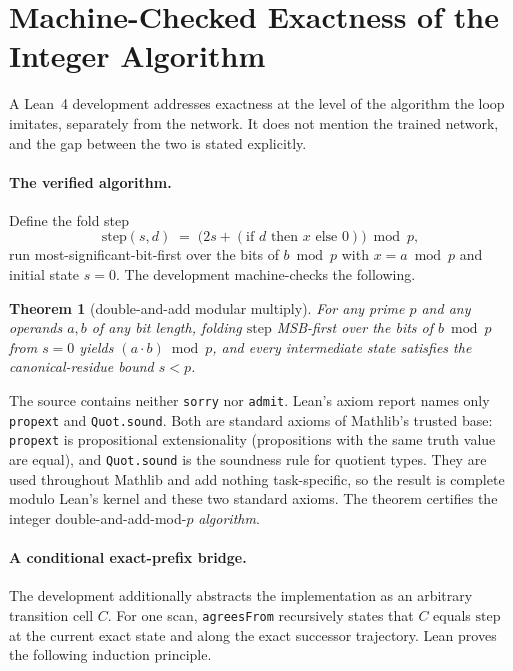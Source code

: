 \documentclass[11pt]{article}
\newtheorem{theorem}{Theorem}
\begin{document}
\section{Machine-Checked Exactness of the Integer Algorithm}
\label{sec:lean}

A Lean~4 development addresses exactness at the level of the algorithm the loop
imitates, separately from the network. It does not mention the trained network, and
the gap between the two is stated explicitly.

\paragraph{The verified algorithm.}
Define the fold step
\[
 \mathrm{step}(s,d) \;=\; \bigl(2s + (\text{if } d \text{ then } x \text{ else } 0)\bigr) \bmod p ,
\]
run most-significant-bit-first over the bits of $b \bmod p$ with $x = a \bmod p$ and
initial state $s = 0$. The development machine-checks the following.

\begin{theorem}[double-and-add modular multiply]
For any prime $p$ and any operands $a, b$ of any bit length, folding
$\mathrm{step}$ MSB-first over the bits of $b \bmod p$ from $s = 0$ yields
$(a \cdot b) \bmod p$, and every intermediate state satisfies the canonical-residue
bound $s < p$.
\end{theorem}

The source contains neither \texttt{sorry} nor \texttt{admit}. Lean's axiom
report names only \texttt{propext} and \texttt{Quot.sound}. Both are standard axioms of Mathlib's
trusted base: \texttt{propext} is propositional extensionality (propositions with
the same truth value are equal), and \texttt{Quot.sound} is the soundness rule for
quotient types. They are used throughout Mathlib and add nothing task-specific, so
the result is complete modulo Lean's kernel and these two standard axioms. The
theorem certifies the integer double-and-add-mod-$p$ \emph{algorithm}.

\paragraph{A conditional exact-prefix bridge.}
The development additionally abstracts the implementation as an arbitrary
transition cell $C$. For one scan, \texttt{agreesFrom} recursively states that
$C$ equals $\mathrm{step}$ at the current exact state and along the exact
successor trajectory. Lean proves the following induction principle.
\end{document}
